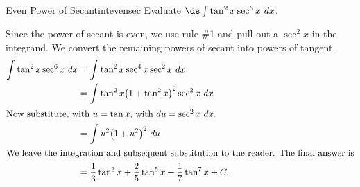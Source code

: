 %


\begin{example}{Even Power of Secant}{intevensec}
Evaluate $\ds\int \tan^2x\sec^6x\ dx$.
\end{example}  

\begin{solution}
Since the power of secant is even, we use rule \#1 and pull out a $\sec^2x$ in the integrand. We convert the remaining powers of secant into powers of tangent.
\begin{align*}
\int \tan^2x\sec^6x\ dx &= \int\tan^2x\sec^4x\sec^2x\ dx \\
		&= \int \tan^2x\big(1+\tan^2x\big)^2\sec^2x\ dx \\
\intertext{Now substitute, with $u=\tan x$, with $du = \sec^2x\ dx$.}
		&=\int u^2\big(1+u^2\big)^2\ du\\
\intertext{We leave the integration and subsequent substitution to the reader. The final answer is}
		&=\frac13\tan^3x+\frac25\tan^5x+\frac17\tan^7x+C.
\end{align*}
\end{solution}



